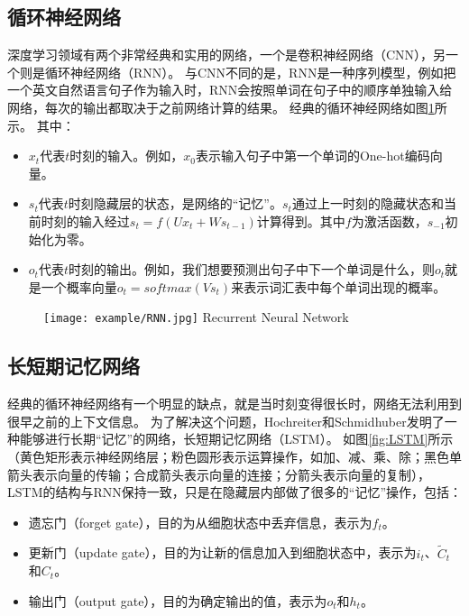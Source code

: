 \subsection{循环神经网络}

深度学习领域有两个非常经典和实用的网络，一个是卷积神经网络（CNN），另一个则是循环神经网络（RNN）\cite{goodfellow2016deep}。
与CNN不同的是，RNN是一种序列模型，例如把一个英文自然语言句子作为输入时，RNN会按照单词在句子中的顺序单独输入给网络，每次的输出都取决于之前网络计算的结果。
经典的循环神经网络如图\ref{fig:RNN}所示。
其中：
\begin{itemize}
  \item $x_t$代表$t$时刻的输入。例如，$x_0$表示输入句子中第一个单词的One-hot编码向量。
  \item $s_t$代表$t$时刻隐藏层的状态，是网络的“记忆”。$s_t$通过上一时刻的隐藏状态和当前时刻的输入经过$s_t = f(Ux_t + Ws_{t-1})$计算得到。其中$f$为激活函数，$s_{-1}$初始化为零。
  \item $o_t$代表$t$时刻的输出。例如，我们想要预测出句子中下一个单词是什么，则$o_t$就是一个概率向量$o_t = softmax(Vs_t)$来表示词汇表中每个单词出现的概率。
\end{itemize}

\begin{figure}[!htp]
  \centering
  \texttt{[image: example/RNN.jpg]}
    {Recurrent Neural Network}
  \label{fig:RNN}
\end{figure}

\subsection{长短期记忆网络}

经典的循环神经网络有一个明显的缺点，就是当时刻变得很长时，网络无法利用到很早之前的上下文信息。
为了解决这个问题，Hochreiter和Schmidhuber发明了一种能够进行长期“记忆”的网络，长短期记忆网络（LSTM）\cite{goodfellow2016deep}。
如图\ref{fig:LSTM}所示（黄色矩形表示神经网络层；粉色圆形表示运算操作，如加、减、乘、除；黑色单箭头表示向量的传输；合成箭头表示向量的连接；分箭头表示向量的复制），LSTM的结构与RNN保持一致，只是在隐藏层内部做了很多的“记忆”操作，包括：

\begin{itemize}
   \item 遗忘门（forget gate），目的为从细胞状态中丢弃信息，表示为$f_t$。
   \item 更新门（update gate），目的为让新的信息加入到细胞状态中，表示为$i_t$、$\widetilde{C}_t$和$C_t$。
   \item 输出门（output gate），目的为确定输出的值，表示为$o_t$和$h_t$。
\end{itemize}

